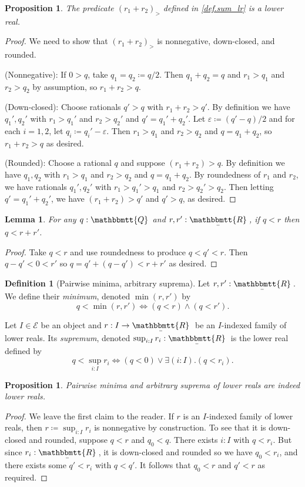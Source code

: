 \documentclass[11pt, oneside, article]{memoir}
\theoremstyle{plain}
\newtheorem{proposition}[theorem]{Proposition}
\newtheorem{lemma}[theorem]{Lemma}
\theoremstyle{definition}
\newtheorem{definition}[theorem]{Definition}
\theoremstyle{remark}
\newcommand{\cat}[1]{\mathcal{#1}}
\newcommand{\ubar}[1]{\underaccent{\bar}{#1}}
\newcommand{\internal}[1]{\raisebox{-.03ex}{$\mathbbmtt{#1}$}}
\newcommand{\hs}{\hspace{1.1pt}}
\newcommand{\tqq}{\internal{Q}\hs}
\newcommand{\trr}{\internal{R}\hs}
\newcommand{\tlrr}{\ubar{\trr}\hs}
\renewcommand{\iff}{\Leftrightarrow}
\begin{document}
\begin{proposition}\label{prop.sum_lr}
The predicate $(r_1+r_2)_>$ defined in \cref{def.sum_lr} is a lower real.
\end{proposition}
\begin{proof}
We need to show that $(r_1+r_2)_>$ is nonnegative, down-closed, and rounded.

\noindent (Nonnegative): If $0>q$, take $q_1=q_2\coloneqq q/2$. Then $q_1+q_2=q$ and $r_1>q_1$ and $r_2>q_2$ by assumption, so $r_1+r_2>q$.

\noindent(Down-closed): Choose rationals $q'>q$ with $r_1+r_2>q'$. By definition we have $q_1',q_2'$ with $r_1>q_1'$ and $r_2>q_2'$ and $q'=q_1'+q_2'$. Let $\varepsilon\coloneqq (q'-q)/2$ and for each $i=1,2$, let $q_i\coloneqq q_i'-\varepsilon$. Then $r_1>q_1$ and $r_2>q_2$ and $q=q_1+q_2$, so $r_1+r_2>q$ as desired.

\noindent(Rounded): Choose a rational $q$ and suppose $(r_1+r_2)>q$. By definition we have $q_1,q_2$ with $r_1>q_1$ and $r_2>q_2$ and $q=q_1+q_2$. By roundedness of $r_1$ and $r_2$, we have rationals $q_1',q_2'$ with $r_1>q_1'>q_1$ and $r_2>q_2'>q_2$. Then letting $q'=q_1'+q_2'$, we have $(r_1+r_2)>q'$ and $q'>q$, as desired.
\end{proof}

\begin{lemma}\label{lemma.sums_bigger}
For any $q:\tqq$ and $r,r':\tlrr$, if $q<r$ then $q<r+r'$.
\end{lemma}
\begin{proof}
Take $q<r$ and use roundedness to produce $q<q'<r$. Then $q-q'<0<r'$ so $q=q'+(q-q')<r+r'$ as desired.
\end{proof}


\begin{definition}[Pairwise minima, arbitrary suprema]\label{def.min_sup}
Let $r,r':\tlrr$. We define their \emph{minimum}, denoted $\min(r,r')$ by
\[q<\min(r,r') \iff (q<r)\wedge(q<r').\]

Let $I\in\cat{E}$ be an object and $r:I\to\tlrr$ be an $I$-indexed family of lower reals. Its \emph{supremum}, denoted $\sup_{i:I}r_i:\tlrr$ is the lower real defined  by 
\[q<\sup_{i:I}r_i\iff (q<0)\vee\exists(i:I).(q<r_i).\]
\end{definition}

\begin{proposition}
Pairwise minima and arbitrary suprema of lower reals are indeed lower reals.
\end{proposition}
\begin{proof}
We leave the first claim to the reader. If $r$ is an $I$-indexed family of lower reals, then $r\coloneqq\sup_{i:I}r_i$ is nonnegative by construction. To see that it is down-closed and rounded, suppose $q<r$ and $q_0<q$. There exists $i:I$ with $q<r_i$. But since $r_i:\tlrr$, it is down-closed and rounded so we have $q_0<r_i$, and there exists some $q'<r_i$ with $q<q'$. It follows that $q_0<r$ and $q'<r$ as required.
\end{proof}
\end{document}
